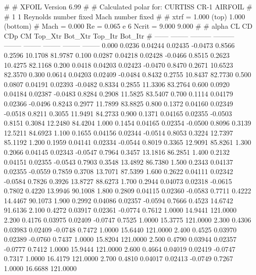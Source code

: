 #  
#       XFOIL         Version 6.99
#  
# Calculated polar for: CURTISS CR-1 AIRFOIL                            
#  
# 1 1 Reynolds number fixed          Mach number fixed         
#  
# xtrf =   1.000 (top)        1.000 (bottom)  
# Mach =   0.000     Re =     0.065 e 6     Ncrit =   9.000  9.000
#  
#   alpha    CL        CD       CDp       CM     Top_Xtr  Bot_Xtr  Top_Itr  Bot_Itr
#  ------ -------- --------- --------- -------- -------- -------- -------- --------
   0.000   0.0236   0.04244   0.02435  -0.0473   0.8566   0.2596  10.1708  81.9787
   0.100   0.0287   0.04218   0.02428  -0.0466   0.8515   0.2623  10.4275  82.1168
   0.200   0.0418   0.04203   0.02423  -0.0470   0.8470   0.2671  10.6523  82.3570
   0.300   0.0614   0.04203   0.02409  -0.0484   0.8432   0.2755  10.8437  82.7730
   0.500   0.0807   0.04191   0.02393  -0.0482   0.8334   0.2855  11.3306  83.2764
   0.600   0.0920   0.04184   0.02387  -0.0483   0.8284   0.2908  11.5825  83.5407
   0.700   0.1114   0.04179   0.02366  -0.0496   0.8243   0.2977  11.7899  83.8825
   0.800   0.1372   0.04160   0.02349  -0.0518   0.8211   0.3055  11.9491  84.2733
   0.900   0.1371   0.04165   0.02355  -0.0503   0.8151   0.3084  12.2480  84.4204
   1.000   0.1454   0.04165   0.02354  -0.0500   0.8096   0.3139  12.5211  84.6923
   1.100   0.1655   0.04156   0.02344  -0.0514   0.8053   0.3224  12.7397  85.1192
   1.200   0.1959   0.04141   0.02334  -0.0544   0.8019   0.3365  12.9091  85.8261
   1.300   0.2066   0.04145   0.02343  -0.0547   0.7964   0.3457  13.1816  86.2851
   1.400   0.2132   0.04151   0.02355  -0.0543   0.7903   0.3548  13.4892  86.7380
   1.500   0.2343   0.04137   0.02355  -0.0559   0.7859   0.3708  13.7071  87.5399
   1.600   0.2622   0.04111   0.02342  -0.0584   0.7826   0.3926  13.8727  88.6273
   1.700   0.2944   0.04073   0.02318  -0.0615   0.7802   0.4220  13.9946  90.1008
   1.800   0.2809   0.04115   0.02360  -0.0583   0.7711   0.4222  14.4467  90.1073
   1.900   0.2992   0.04086   0.02357  -0.0594   0.7666   0.4523  14.6742  91.6136
   2.100   0.4272   0.03917   0.02361  -0.0774   0.7612   1.0000  14.9441 121.0000
   2.200   0.4176   0.03975   0.02409  -0.0747   0.7525   1.0000  15.3775 121.0000
   2.300   0.4306   0.03983   0.02409  -0.0748   0.7472   1.0000  15.6440 121.0000
   2.400   0.4525   0.03970   0.02389  -0.0760   0.7437   1.0000  15.8204 121.0000
   2.500   0.4790   0.03944   0.02357  -0.0777   0.7412   1.0000  15.9444 121.0000
   2.600   0.4664   0.04019   0.02419  -0.0747   0.7317   1.0000  16.4179 121.0000
   2.700   0.4810   0.04017   0.02413  -0.0749   0.7267   1.0000  16.6688 121.0000
